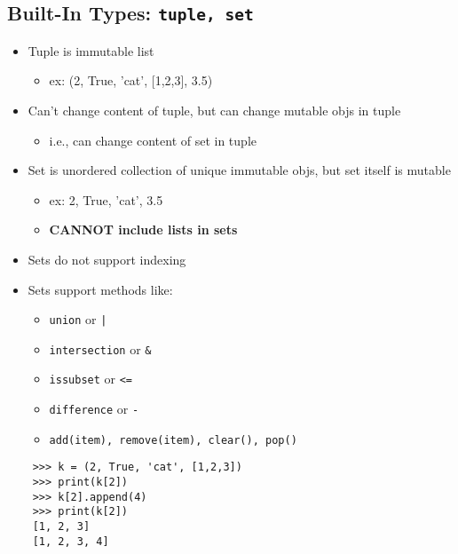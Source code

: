 \documentclass{article}
\begin{document}
\subsection{Built-In Types: \texttt{tuple, set}}
    \begin{multicols}{2}
        \begin{itemize}
            \item Tuple is immutable list
                \begin{itemize}
                    \item ex: (2, True, 'cat', [1,2,3], 3.5)
                \end{itemize}
            \item Can't change content of tuple, but can change mutable objs in tuple
                \begin{itemize}
                    \item i.e., can change content of set in tuple
                \end{itemize}
        \item Set is unordered collection of unique immutable objs, but set itself is mutable
            \begin{itemize}
                \item ex: {2, True, 'cat', 3.5}
                \item \textbf{CANNOT include lists in sets}
            \end{itemize}
        \item Sets do not support indexing
        \item Sets support methods like:
            \begin{itemize}
                \item \texttt{union} or \texttt{|}
                \item \texttt{intersection} or \texttt{\&}
                \item \texttt{issubset} or \texttt{<=}
                \item \texttt{difference} or \texttt{-}
                \item \texttt{add(item), remove(item), clear(), pop()}
            \end{itemize}
        \end{itemize}
    \end{multicols}

\begin{lstlisting}
    >>> k = (2, True, 'cat', [1,2,3])
    >>> print(k[2])
    >>> k[2].append(4)
    >>> print(k[2])
    [1, 2, 3]
    [1, 2, 3, 4]
\end{lstlisting}
\end{document}
